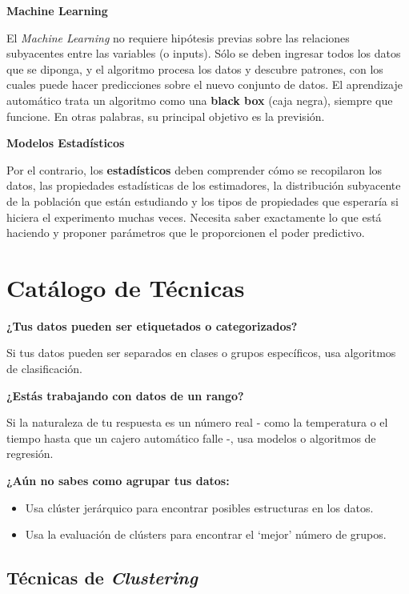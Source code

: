\documentclass[]{book}
\providecommand{\tightlist}{%
  \setlength{\itemsep}{0pt}\setlength{\parskip}{0pt}}
\begin{document}
\textbf{Machine Learning}

El \emph{Machine Learning} no requiere hipótesis previas sobre las relaciones subyacentes entre las variables (o inputs). Sólo se deben ingresar todos los datos que se diponga, y el algoritmo procesa los datos y descubre patrones, con los cuales puede hacer predicciones sobre el nuevo conjunto de datos. El aprendizaje automático trata un algoritmo como una \textbf{black box} (caja negra), siempre que funcione. En otras palabras, su principal objetivo es la previsión.

\textbf{Modelos Estadísticos}

Por el contrario, los \textbf{estadísticos} deben comprender cómo se recopilaron los datos, las propiedades estadísticas de los estimadores, la distribución subyacente de la población que están estudiando y los tipos de propiedades que esperaría si hiciera el experimento muchas veces. Necesita saber exactamente lo que está haciendo y proponer parámetros que le proporcionen el poder predictivo.

\hypertarget{catalogo-de-tecnicas}{%
\chapter{Catálogo de Técnicas}\label{catalogo-de-tecnicas}}

\textbf{¿Tus datos pueden ser etiquetados o categorizados?}

Si tus datos pueden ser separados en clases o grupos específicos, usa algoritmos de clasificación.

\textbf{¿Estás trabajando con datos de un rango?}

Si la naturaleza de tu respuesta es un número real - como la temperatura o el tiempo hasta que un cajero automático falle -, usa modelos o algoritmos de regresión.

\textbf{¿Aún no sabes como agrupar tus datos:}

\begin{itemize}
\tightlist
\item
  Usa clúster jerárquico para encontrar posibles estructuras en los datos.
\item
  Usa la evaluación de clústers para encontrar el `mejor' número de grupos.
\end{itemize}

\hypertarget{tecnicas-de-clustering}{%
\section{\texorpdfstring{Técnicas de \emph{Clustering}}{Técnicas de Clustering}}\label{tecnicas-de-clustering}}
\end{document}
